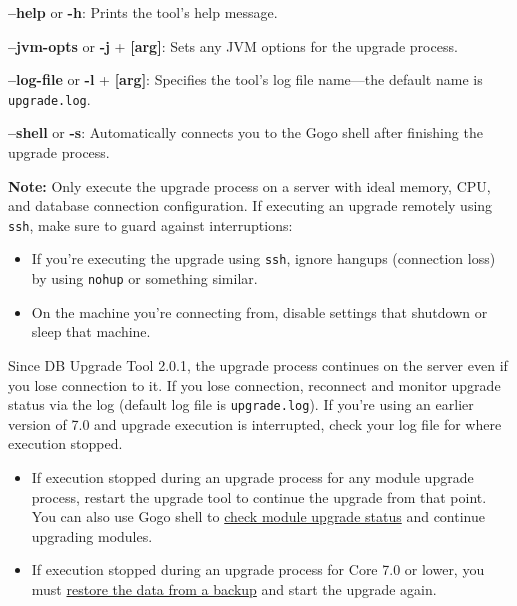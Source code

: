 \textbf{--help} or \textbf{-h}: Prints the tool's help message.

\textbf{--jvm-opts} or \textbf{-j} + \textbf{{[}arg{]}}: Sets any JVM
options for the upgrade process.

\textbf{--log-file} or \textbf{-l} + \textbf{{[}arg{]}}: Specifies the
tool's log file name---the default name is \texttt{upgrade.log}.

\textbf{--shell} or \textbf{-s}: Automatically connects you to the Gogo
shell after finishing the upgrade process.

\noindent\hrulefill

\textbf{Note:} Only execute the upgrade process on a server with ideal
memory, CPU, and database connection configuration. If executing an
upgrade remotely using \texttt{ssh}, make sure to guard against
interruptions:

\begin{itemize}
\tightlist
\item
  If you're executing the upgrade using \texttt{ssh}, ignore hangups
  (connection loss) by using \texttt{nohup} or something similar.
\item
  On the machine you're connecting from, disable settings that shutdown
  or sleep that machine.
\end{itemize}

Since DB Upgrade Tool 2.0.1, the upgrade process continues on the server
even if you lose connection to it. If you lose connection, reconnect and
monitor upgrade status via the log (default log file is
\texttt{upgrade.log}). If you're using an earlier version of 7.0 and
upgrade execution is interrupted, check your log file for where
execution stopped.

\begin{itemize}
\tightlist
\item
  If execution stopped during an upgrade process for any module upgrade
  process, restart the upgrade tool to continue the upgrade from that
  point. You can also use Gogo shell to
  \hyperref[gogo-shell-commands-for-module-upgrades]{check module
  upgrade status} and continue upgrading modules.
\item
  If execution stopped during an upgrade process for Core 7.0 or lower,
  you must
  \href{/docs/7-0/deploy/-/knowledge_base/d/backing-up-a-liferay-installation}{restore
  the data from a backup} and start the upgrade again.
\end{itemize}

\noindent\hrulefill

